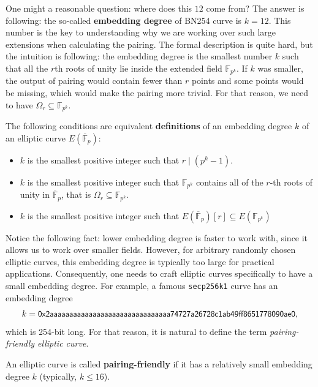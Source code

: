\documentclass[../../book.tex]{subfiles}
\begin{document}
\begin{remark}
    One might a reasonable question: where does this $12$ come from? The answer is following: the so-called \textbf{embedding degree} of BN254 curve is $k=12$. This number is the key to understanding why we are working over such large extensions when calculating the pairing. The formal description is quite hard, but the intuition is following: the embedding degree is the smallest number $k$ such that all the $r$th roots of unity lie inside the extended field $\mathbb{F}_{p^k}$. If $k$ was smaller, the output of pairing would contain fewer than $r$ points and some points would be missing, which would make the pairing more trivial. For that reason, we need to have $\Omega_r \subseteq \mathbb{F}_{p^k}$.
\end{remark}

\begin{definition}
    The following conditions are equivalent \textbf{definitions} of an embedding degree $k$ of an elliptic curve $E(\overline{\mathbb{F}}_p)$:
    \begin{itemize}
        \item $k$ is the smallest positive integer such that $r \mid (p^k-1)$.
        \item $k$ is the smallest positive integer such that $\mathbb{F}_{p^k}$ contains all of the $r$-th roots of unity in $\overline{\mathbb{F}}_p$, that is $\Omega_r \subseteq \mathbb{F}_{p^k}$.
        \item $k$ is the smallest positive integer such that $E(\overline{\mathbb{F}}_p)[r] \subseteq E(\mathbb{F}_{p^k})$
    \end{itemize}
\end{definition}

Notice the following fact: lower embedding degree is faster to work with, since it allows us to work over smaller fields. 
However, for arbitrary randomly chosen elliptic curves, this embedding degree is typically too large for practical applications. 
Consequently, one needs to craft elliptic curves specifically to have a small embedding degree. 
For example, a famous \texttt{secp256k1} curve has an embedding degree
\begin{equation*}
    k = \scalebox{0.95}{$\mathsf{0x2aaaaaaaaaaaaaaaaaaaaaaaaaaaaaaa74727a26728c1ab49ff8651778090ae0}$},
\end{equation*}
which is 254-bit long. For that reason, it is natural to define the term \textit{pairing-friendly elliptic curve}.
\begin{definition}
    An elliptic curve is called \textbf{pairing-friendly} if it has a relatively small embedding degree $k$ (typically, $k \leq 16$).
\end{definition}
\end{document}

